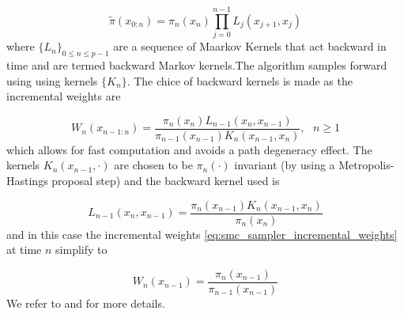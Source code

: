 \documentclass{article}
\begin{document}
\begin{equation} \label{eq:smc_sampler_1}
\tilde{\pi}(x_{0:n}) = \pi_{n}(x_{n}) \prod_{j=0}^{n-1} L_{j}(x_{j+1},x_{j}) 
\end{equation}
where $\{ L_{n} \}_{0 \leq n \leq p-1}$ are a sequence of Maarkov Kernels that act backward in time and are termed backward Markov kernels.The algorithm samples forward using using kernels $\{ K_{n} \}$. The chice of backward kernels is made as the incremental weights are 

\begin{equation} \label{eq:smc_sampler_incremental_weights}
W_{n}(x_{n-1:n}) = \frac{ \pi_{n}(x_{n}) L_{n-1}(x_{n},x_{n-1}) }{ \pi_{n-1}(x_{n-1}) K_{n}(x_{n-1},x_{n}) }, \text{ } n \geq 1
\end{equation}
which allows for fast computation and avoids a path degeneracy effect. The kernels $K_{n}(x_{n-1},\cdot)$ are chosen to be $\pi_{n}(\cdot)$ invariant (by using a Metropolis-Hastings proposal step) and the backward kernel used is

\begin{equation} \label{eq:backward_kernel}
L_{n-1}(x_{n},x_{n-1}) = \frac{ \pi_{n}(x_{n-1}) K_{n}(x_{n-1},x_{n})}{ \pi_{n}(x_{n}) } 
\end{equation}
and in this case the incremental weights \eqref{eq:smc_sampler_incremental_weights} at time $n$ simplify to 

\begin{equation} \label{simplified_incremental_weights}
W_{n}(x_{n-1}) = \frac{ \pi_{n}(x_{n-1}) } { \pi_{n-1}(x_{n-1}) } 
\end{equation}
We refer to \cite{SMC_option_jasra} and \cite{SMC_samplers} for more details.
\end{document}
